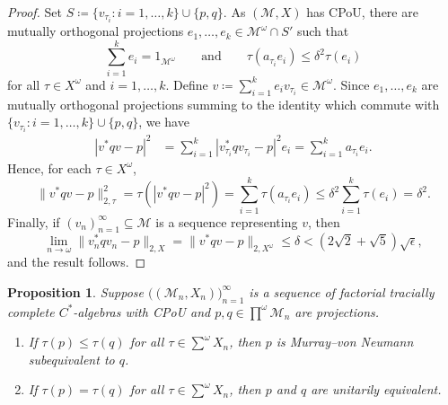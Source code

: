 \documentclass[a4paper,11pt]{amsart}
\newtheorem{proposition}[theorem]{Proposition}
\theoremstyle{definition}
\numberwithin{equation}{section}
\numberwithin{theorem}{section}
\newcommand{\M}{\mathcal{M}}
\begin{document}
\begin{proof}
	Set $S \coloneqq \{v_{\tau_i}: i=1,\ldots,k\} \cup \{p,q\}$. As $(\M, X)$ has CPoU, there are mutually orthogonal projections $e_1, \ldots, e_k \in \M^\omega \cap S'$ such that
	\begin{equation}
		\sum_{i=1}^k e_i = 1_{\M^\omega} \qquad \text{and} \qquad \tau(a_{\tau_i} e_i) \leq \delta^2\tau(e_i)
	\end{equation}
	for all $\tau \in X^\omega$ and $i= 1, \ldots, k$.  Define $v \coloneqq \sum_{i=1}^k e_i v_{\tau_i} \in \M^\omega$. 
	Since $e_1, \ldots, e_k$ are mutually orthogonal projections summing to the identity which commute with $\{v_{\tau_i}: i=1,\ldots,k\} \cup \{p,q\}$, we have
	\begin{equation}\begin{split}
		|v^*qv - p|^2 &= \sum_{i=1}^k |v_{\tau_i}^* q v_{\tau_i} - p|^2e_i = \sum_{i=1}^k a_{\tau_i}e_i. 
	\end{split}\end{equation}
	Hence, for each $\tau \in X^\omega$,
	\begin{equation}
		\|v^* q v - p \|_{2, \tau}^2
		= \tau(|v^*qv - p|^2)
		= \sum_{i=1}^k \tau(a_{\tau_i} e_i)
		\leq \delta^2 \sum_{i=1}^k \tau(e_i) = \delta^2.
	\end{equation}
	Finally, if $(v_n)_{n=1}^\infty \subseteq \M$ is a sequence representing $v$, then
	\begin{equation}
		\lim_{n \rightarrow \omega} \|v_n^* q v_n - p\|_{2, X} = \|v^*q v - p\|_{2, X^\omega} \leq \delta < (2 \sqrt{2} + \sqrt{5}) \sqrt{\epsilon},
	\end{equation}
	and the result follows.
\end{proof}

\begin{proposition}\label{prop:approximate-comparison}
	Suppose $\big((\M_n, X_n)\big)_{n=1}^\infty$ is a sequence of factorial tracially complete $C^*$-algebras with CPoU and $p, q \in \prod^\omega \M_n$ are projections.
	\begin{enumerate}
		\item\label{approx-comp-1} If $\tau(p) \leq \tau(q)$ for all $\tau \in \sum^\omega X_n$, then $p$ is Murray--von Neumann subequivalent to $q$.
		\item\label{approx-comp-2} If $\tau(p) = \tau(q)$ for all $\tau \in \sum^\omega X_n$, then $p$ and $q$ are unitarily equivalent.
	\end{enumerate}
\end{proposition}
\end{document}
